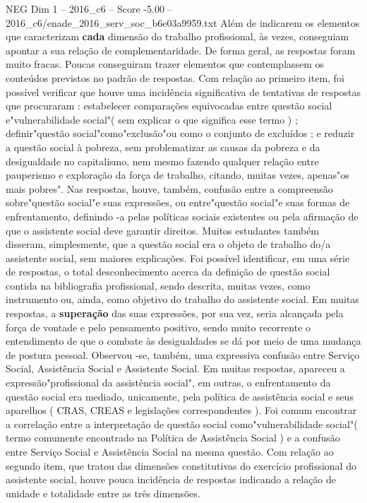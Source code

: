 \begin{textsample}{NEG Dim 1 – 2016\_c6 – Score -5.00 – 2016\_c6/enade\_2016\_serv\_soc\_b6e03a9959.txt}
Além de indicarem os elementos que caracterizam \textbf{cada} dimensão do trabalho profissional, às vezes, conseguiam apontar a sua relação de complementaridade.
De forma geral, as respostas foram muito fracas.
Poucas conseguiram trazer elementos que contemplassem os conteúdos previstos no padrão de respostas.
Com relação ao primeiro item, foi possível verificar que houve uma incidência significativa de tentativas de respostas que procuraram : estabelecer comparações equivocadas entre questão social e"vulnerabilidade social"( sem explicar o que significa esse termo ) ; definir"questão social"como"exclusão"ou como o conjunto de excluídos ; e reduzir a questão social à pobreza, sem problematizar as causas da pobreza e da desigualdade no capitalismo, nem mesmo fazendo qualquer relação entre pauperismo e exploração da força de trabalho, citando, muitas vezes, apenas"os mais pobres".
Nas respostas, houve, também, confusão entre a compreensão sobre"questão social"e suas expressões, ou entre"questão social"e suas formas de enfrentamento, definindo -a pelas políticas sociais existentes ou pela afirmação de que o assistente social deve garantir direitos.
Muitos estudantes também disseram, simplesmente, que a questão social era o objeto de trabalho do/a assistente social, sem maiores explicações.
Foi possível identificar, em uma série de respostas, o total desconhecimento acerca da definição de questão social contida na bibliografia profissional, sendo descrita, muitas vezes, como instrumento ou, ainda, como objetivo do trabalho do assistente social.
Em muitas respostas, a \textbf{superação} das suas expressões, por sua vez, seria alcançada pela força de vontade e pelo pensamento positivo, sendo muito recorrente o entendimento de que o combate às desigualdades se dá por meio de uma mudança de postura pessoal.
Observou -se, também, uma expressiva confusão entre Serviço Social, Assistência Social e Assistente Social.
Em muitas respostas, apareceu a expressão"profissional da assistência social", em outras, o enfrentamento da questão social era mediado, unicamente, pela política de assistência social e seus aparelhos ( CRAS, CREAS e legislações correspondentes ).
Foi comum encontrar a correlação entre a interpretação de questão social como"vulnerabilidade social"( termo comumente encontrado na Política de Assistência Social ) e a confusão entre Serviço Social e Assistência Social na mesma questão.
Com relação ao segundo item, que tratou das dimensões constitutivas do exercício profissional do assistente social, houve pouca incidência de respostas indicando a relação de unidade e totalidade entre as três dimensões.

\end{textsample}
